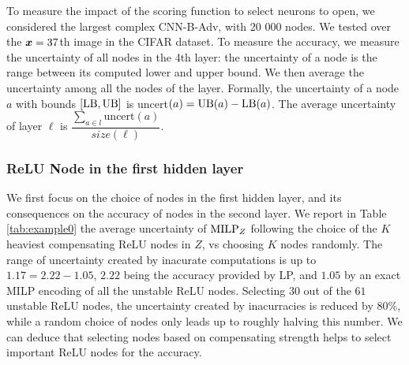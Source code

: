 To measure the impact of the scoring function to select neurons to open, 
we considered the largest complex CNN-B-Adv, with 20 000 nodes. 
We tested over the ${\bm{x}}=37$th image in the CIFAR dataset.
To measure the accuracy, we measure the uncertainty of all nodes in the 4th layer:
the uncertainty of a node is the range between its computed lower and upper bound. 
We then average the uncertainty among all the nodes of the layer.
Formally, the uncertainty of a node $a$ with bounds $[\mathrm{LB},\mathrm{UB}]$ is uncert$(a) = \mathrm{UB}(a) - \mathrm{LB}(a)$. The average uncertainty of layer $\ell$ is 
$\dfrac{\sum_{a\in l} \text{uncert}(a)}{size(\ell)}.$






\iffalse

\subsubsection*{ReLU Node in the first hidden layer}


We first focus on the choice of nodes in the first hidden layer, and its consequences on the accuracy of nodes in the second layer. 
We report in Table \ref{tab:example0} the average uncertainty of ${\textrm{MILP}}_Z$ following the choice of the $K$ heaviest compensating ReLU nodes in $Z$, vs choosing $K$ nodes randomly. The range of uncertainty created by inacurate computations is up to $1.17=2.22-1.05$, $2.22$ being the accuracy provided by LP, and $1.05$ by an exact MILP encoding of all the unstable ReLU nodes. Selecting $30$ out of the $61$ unstable ReLU nodes, the uncertainty created by inacurracies is reduced by $80\%$, while a random choice of nodes only leads up to roughly halving this number. We can deduce that selecting nodes based on compensating strength helps to select important ReLU nodes for the accuracy.



